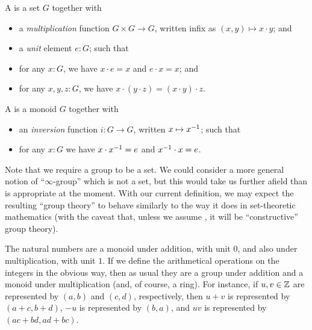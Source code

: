 \begin{defn}
  A 
  is a set $G$ together with
  \begin{itemize}
  \item a \emph{multiplication}
    function $G\times G\to G$, written infix as $(x,y) \mapsto x\cdot y$; and
  \item a \emph{unit}
    element $e:G$; such that
  \item for any $x:G$, we have $x\cdot e = x$ and $e\cdot x = x$; and
  \item for any $x,y,z:G$, we have $x\cdot (y\cdot z) = (x\cdot y)\cdot z$.
  \end{itemize}
  A 
  is a monoid $G$ together with
  \begin{itemize}
  \item an \emph{inversion} function $i:G\to G$, written $x\mapsto \mathord{{x}^{-1}}$; such that
  \item for any $x:G$ we have $x\cdot \mathord{{x}^{-1}} = e$ and $\mathord{{x}^{-1}} \cdot x = e$.
  \end{itemize}
\end{defn}

\begin{rmk}\label{rmk:infty-group}
Note that we require a group to be a set.
We could consider a more general notion of ``$\infty$-group''%
which is not a set, but this would take us further afield than is appropriate at the moment.
With our current definition, we may expect the resulting ``group theory'' to behave similarly to the way it does in set-theoretic mathematics (with the caveat that, unless we assume \LEM{}, it will be ``constructive'' group theory).
\end{rmk}

\begin{eg}
  The natural numbers \N are a monoid under addition, with unit $0$, and also under multiplication, with unit $1$.
  If we define the arithmetical operations on the integers \Z in the obvious way, then as usual they are a group under addition and a monoid under multiplication (and, of course, a ring).
  For instance, if $u, v \in \mathbb{Z}$ are represented by $(a,b)$ and $(c,d)$, respectively, then $u + v$ is represented by $(a + c, b + d)$, $-u$ is represented by $(b, a)$, and $u v$ is represented by $(a c + b d, a d + b c)$.
\end{eg}

